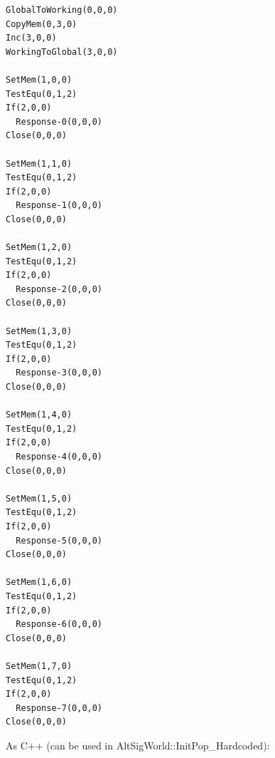 \documentclass[
]{book}
\begin{document}
\begin{verbatim}
GlobalToWorking(0,0,0)
CopyMem(0,3,0)
Inc(3,0,0)
WorkingToGlobal(3,0,0)

SetMem(1,0,0)
TestEqu(0,1,2)
If(2,0,0)
  Response-0(0,0,0)
Close(0,0,0)

SetMem(1,1,0)
TestEqu(0,1,2)
If(2,0,0)
  Response-1(0,0,0)
Close(0,0,0)

SetMem(1,2,0)
TestEqu(0,1,2)
If(2,0,0)
  Response-2(0,0,0)
Close(0,0,0)

SetMem(1,3,0)
TestEqu(0,1,2)
If(2,0,0)
  Response-3(0,0,0)
Close(0,0,0)

SetMem(1,4,0)
TestEqu(0,1,2)
If(2,0,0)
  Response-4(0,0,0)
Close(0,0,0)

SetMem(1,5,0)
TestEqu(0,1,2)
If(2,0,0)
  Response-5(0,0,0)
Close(0,0,0)

SetMem(1,6,0)
TestEqu(0,1,2)
If(2,0,0)
  Response-6(0,0,0)
Close(0,0,0)

SetMem(1,7,0)
TestEqu(0,1,2)
If(2,0,0)
  Response-7(0,0,0)
Close(0,0,0)
\end{verbatim}

As C++ (can be used in AltSigWorld::InitPop\_Hardcoded):
\end{document}
